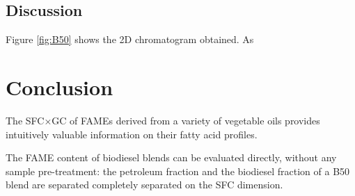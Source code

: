 \subsection{Discussion}

Figure \ref{fig:B50} shows the 2D chromatogram obtained. As 



\section{Conclusion}

The SFC×GC of FAMEs derived from a variety of vegetable oils provides intuitively
valuable information on their fatty acid profiles.

The FAME content of biodiesel blends can be evaluated directly, without any
sample pre-treatment: the petroleum fraction and the biodiesel fraction of a B50
blend are separated completely separated on the SFC dimension.

